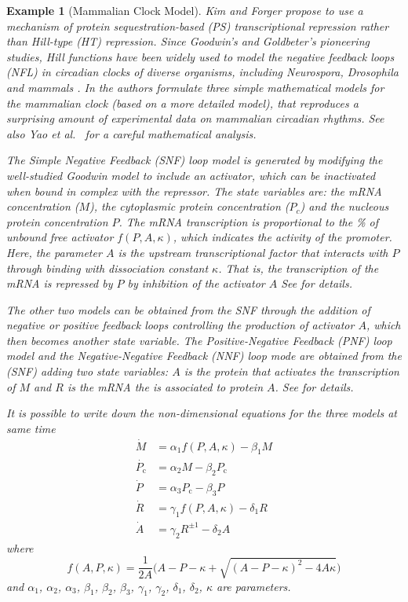 \documentclass[a4paper,fleqn]{cas-dc}
\newtheorem{example}{Example}[section]
\newcommand{\etal}{\textrm{et al.}}
\begin{document}
\begin{example}[Mammalian Clock Model] \normalfont
Kim and Forger \cite{kim2012} propose to use a mechanism of protein sequestration-based (PS) transcriptional repression rather than Hill-type (HT) repression.
Since Goodwin’s and Goldbeter’s pioneering studies, Hill functions have been widely used to model the negative feedback loops (NFL) in circadian clocks of diverse organisms, including \emph{Neurospora}, \emph{Drosophila} and mammals \cite{kim2016}.
In \cite{kim2012} the authors formulate three simple mathematical models for the mammalian clock (based on a more detailed model), that reproduces a surprising amount of experimental data on mammalian circadian rhythms.
See also Yao \etal~\cite{tyson2022} for a careful mathematical analysis.

The Simple Negative Feedback (SNF) loop model is generated by modifying the well-studied Goodwin model to include an activator, which can be inactivated when bound in complex with the repressor. 
The state variables are: the mRNA concentration ($M$), the cytoplasmic protein concentration ($P_c$) and the nucleous protein concentration $P$.
The mRNA transcription is proportional to the \% of unbound free activator $f(P, A, \kappa)$,
which indicates the activity of the promoter.
Here, the parameter $A$ is the upstream transcriptional factor that interacts with $P$ through binding with dissociation constant $\kappa$.
That is, the transcription of the mRNA is repressed by $P$ by inhibition of the activator $A$ 
See \cite{kim2012,tyson2022} for details.

The other two models can be obtained from the SNF through the addition of negative or positive feedback loops controlling the production of activator $A$, which then becomes another state variable.
The Positive-Negative Feedback (PNF) loop model and the Negative-Negative Feedback (NNF) loop mode are obtained from the (SNF) adding two state variables:
$A$ is the protein that activates the transcription of $M$ and $R$ is the mRNA the is associated to protein $A$.
See \cite{kim2012,tyson2022} for details.

It is possible to write down the non-dimensional equations for the three models at same time
\begin{equation}
\begin{split}
 \dot{M} & = \alpha_1 f(P,A,\kappa) - \beta_1 M \\
 \dot{P_{\mathrm{c}}} 
 & = \alpha_2 M - \beta_2 P_{\mathrm{c}} \\
 \dot{P} & = \alpha_3 P_{\mathrm{c}} - \beta_3 P \\
 \dot{R} & = \gamma_1 f(P,A,\kappa) -\delta_1 R \\
 \dot{A} & = \gamma_2 R^{\pm 1} - \delta_2 A
\end{split}
\end{equation}
where
\begin{equation*}
f(A,P,\kappa)  = \frac{1}{2A}
 \bigg(A-P-\kappa+\sqrt{(A-P-\kappa)^2-4A\kappa}\bigg)
\end{equation*}
and $\alpha_1$, $\alpha_2$, $\alpha_3$, $\beta_1$,
$\beta_2$, $\beta_3$, $\gamma_1$, $\gamma_2$, $\delta_1$, $\delta_2$, $\kappa$ are parameters.


\end{example}
\end{document}
